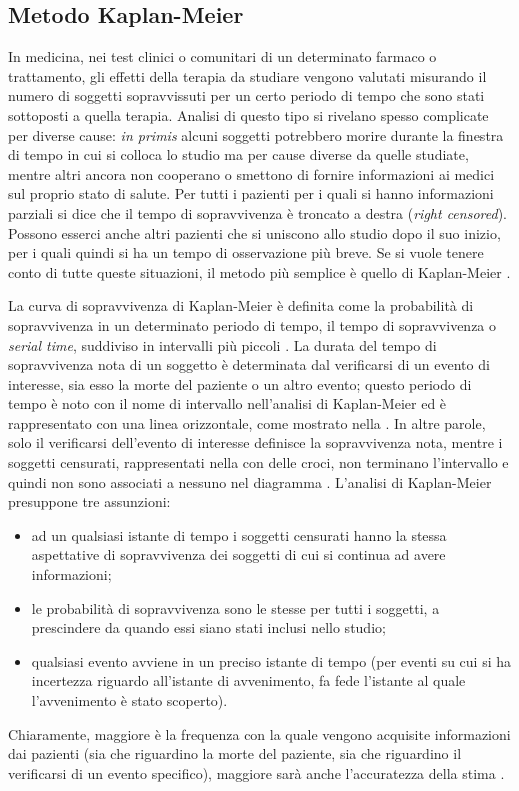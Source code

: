 \subsection{Metodo Kaplan-Meier}\label{km}
In medicina, nei test clinici o comunitari di un determinato farmaco o trattamento, gli effetti della terapia da studiare vengono valutati misurando il numero di soggetti sopravvissuti per un certo periodo di tempo che sono stati sottoposti a quella terapia. Analisi di questo tipo si rivelano spesso complicate per diverse cause: \textit{in primis} alcuni soggetti potrebbero morire durante la finestra di tempo in cui si colloca lo studio ma per cause diverse da quelle studiate, mentre altri ancora non cooperano o smettono di fornire informazioni ai medici sul proprio stato di salute. Per tutti i pazienti per i quali si hanno informazioni parziali si dice che il tempo di sopravvivenza è troncato a destra (\textit{right censored}). Possono esserci anche altri pazienti che si uniscono allo studio dopo il suo inizio, per i quali quindi si ha un tempo di osservazione più breve. Se si vuole tenere conto di tutte queste situazioni, il metodo più semplice è quello di Kaplan-Meier \cite{Goel2010}.

La curva di sopravvivenza di Kaplan-Meier è definita come la probabilità di sopravvivenza in un determinato periodo di tempo, il tempo di sopravvivenza o \textit{serial time}, suddiviso in intervalli più piccoli \cite{altman, Goel2010}. La durata del tempo di sopravvivenza nota di un soggetto è determinata dal verificarsi di un evento di interesse, sia esso la morte del paziente o un altro evento; questo periodo di tempo è noto con il nome di intervallo nell'analisi di Kaplan-Meier ed è rappresentato con una linea orizzontale, come mostrato nella . In altre parole, solo il verificarsi dell'evento di interesse definisce la sopravvivenza nota, mentre i soggetti censurati, rappresentati nella  con delle croci, non terminano l'intervallo e quindi non sono associati a nessuno  nel diagramma \cite{Rich2010}. L'analisi di Kaplan-Meier presuppone tre assunzioni:
\begin{itemize}[label=$-$]
    \item ad un qualsiasi istante di tempo i soggetti censurati hanno la stessa aspettative di sopravvivenza dei soggetti di cui si continua ad avere informazioni;
    \item le probabilità di sopravvivenza sono le stesse per tutti i soggetti, a prescindere da quando essi siano stati inclusi nello studio;
    \item qualsiasi evento avviene in un preciso istante di tempo (per eventi su cui si ha incertezza riguardo all'istante di avvenimento, fa fede l'istante al quale l'avvenimento è stato scoperto).
\end{itemize}
Chiaramente, maggiore è la frequenza con la quale vengono acquisite informazioni dai pazienti (sia che riguardino la morte del paziente, sia che riguardino il verificarsi di un evento specifico), maggiore sarà anche l'accuratezza della stima \cite{Goel2010}.

